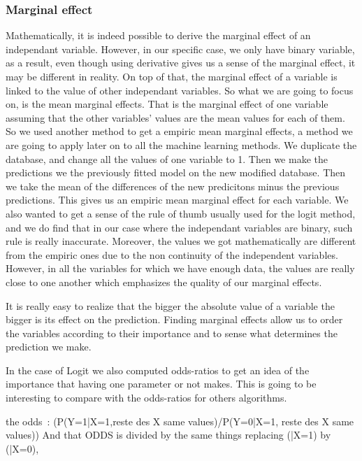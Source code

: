 \subsubsection{Marginal effect}
Mathematically, it is indeed possible to derive the marginal effect of an independant variable. However, in our specific case, we only have binary variable, as a result, even though using derivative gives us a sense of the marginal effect, it may be different in reality. On top of that, the marginal effect of a variable is linked to the value of other independant variables. So what we are going to focus on, is the mean marginal effects. That is the marginal effect of one variable assuming that the other variables’ values are the mean values for each of them.
So we used another method to get a empiric mean marginal effects, a method we are going to apply later on to all the machine learning methods. We duplicate the database, and change all the values of one variable to 1. Then we make the predictions we the previously fitted model on the new modified database. Then we take the mean of the differences of the new predicitons minus the previous predictions. This gives us an empiric mean marginal effect for each variable.
We also wanted to get a sense of the rule of thumb usually used for the logit method, and we do find that in our case where the independant variables are binary, such rule is really inaccurate. Moreover, the values we got mathematically are different from the empiric ones due to the non continuity of the independent variables. However, in all the variables for which we have enough data, the values are really close to one another which emphasizes the quality of our marginal effects.


It is really easy to realize that the bigger the absolute value of a variable the bigger is its effect on the prediction.
Finding marginal effects allow us to order the variables according to their importance and to sense what determines the prediction we make.

In the case of Logit we also computed odds-ratios to get an idea of the importance that having one parameter or not makes. This is going to be interesting to compare with the odds-ratios for others algorithms.


the odds :
(P(Y=1|X=1,reste des X same values)/P(Y=0|X=1, reste des X same values))
And that ODDS is divided by the same things replacing (|X=1) by (|X=0),


